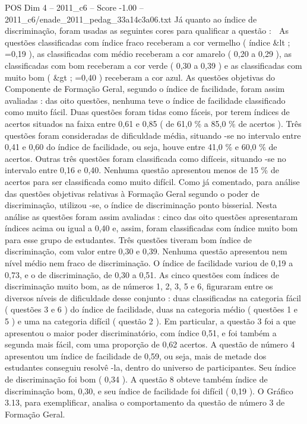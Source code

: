 \begin{textsample}{POS Dim 4 – 2011\_c6 – Score -1.00 – 2011\_c6/enade\_2011\_pedag\_33a14c3a06.txt}
Já quanto ao índice de discriminação, foram usadas as seguintes cores para qualificar a questão :  As questões classificadas com índice fraco receberam a cor vermelho ( índice \&lt ; =0,19 ), as classificadas com médio receberam a cor amarelo ( 0,20 a 0,29 ), as classificadas com bom receberam a cor verde ( 0,30 a 0,39 ) e as classificadas com muito bom ( \&gt ; =0,40 ) receberam a cor azul.
As questões objetivas do Componente de Formação Geral, segundo o índice de facilidade, foram assim avaliadas : das oito questões, nenhuma teve o índice de facilidade classificado como muito fácil.
Duas questões foram tidas como fáceis, por terem índices de acertos situados na faixa entre 0,61 e 0,85 ( de 61,0 \% a 85,0 \% de acertos ).
Três questões foram consideradas de dificuldade média, situando -se no intervalo entre 0,41 e 0,60 do índice de facilidade, ou seja, houve entre 41,0 \% e 60,0 \% de acertos.
Outras três questões foram classificada como difíceis, situando -se no intervalo entre 0,16 e 0,40.
Nenhuma questão apresentou menos de 15 \% de acertos para ser classificada como muito difícil.
Como já comentado, para análise das questões objetivas relativas à Formação Geral segundo o poder de discriminação, utilizou -se, o índice de discriminação ponto bisserial.
Nesta análise as questões foram assim avaliadas : cinco das oito questões apresentaram índices acima ou igual a 0,40 e, assim, foram classificadas com índice muito bom para esse grupo de estudantes.
Três questões tiveram bom índice de discriminação, com valor entre 0,30 e 0,39.
Nenhuma questão apresentou nem nível médio nem fraco de discriminação.
O índice de facilidade variou de 0,19 a 0,73, e o de discriminação, de 0,30 a 0,51.
As cinco questões com índices de discriminação muito bom, as de números 1, 2, 3, 5 e 6, figuraram entre os diversos níveis de dificuldade desse conjunto : duas classificadas na categoria fácil ( questões 3 e 6 ) do índice de facilidade, duas na categoria médio ( questões 1 e 5 ) e uma na categoria difícil ( questão 2 ).
Em particular, a questão 3 foi a que apresentou o maior poder discriminatório, com índice 0,51, e foi também a segunda mais fácil, com uma proporção de 0,62 acertos.
A questão de número 4 apresentou um índice de facilidade de 0,59, ou seja, mais de metade dos estudantes conseguiu resolvê -la, dentro do universo de participantes.
Seu índice de discriminação foi bom ( 0,34 ).
A questão 8 obteve também índice de discriminação bom, 0,30, e seu índice de facilidade foi difícil ( 0,19 ).
O Gráfico 3.13, para exemplificar, analisa o comportamento da questão de número 3 de Formação Geral.

\end{textsample}
